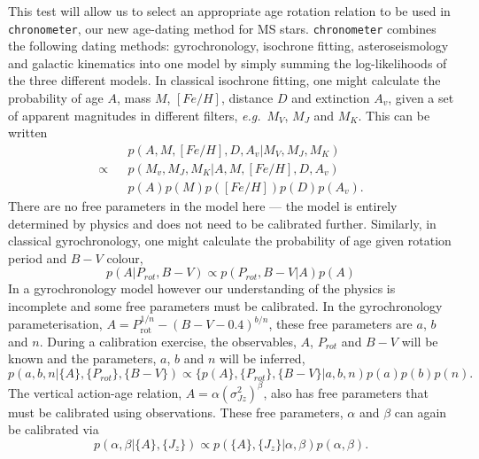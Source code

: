 \documentclass[12pt]{article}
\newcommand{\av}{$A_v$}
\newcommand{\eg}{{\it e.g.}}
\newcommand{\feh}{$[Fe/H]$}
\begin{document}
This test will allow us to select an appropriate age rotation relation to be
used in {\tt chronometer}, our new age-dating method for MS stars.
{\tt chronometer} combines the following dating methods: gyrochronology,
isochrone fitting, asteroseismology and galactic kinematics into one model by
simply summing the log-likelihoods of the three different models.
In classical isochrone fitting, one might calculate the probability of age
$A$, mass $M$, \feh, distance $D$ and extinction \av, given a set of
apparent magnitudes in different filters, \eg\ $M_V$, $M_J$ and $M_K$.
This can be written
\begin{eqnarray}
    &&p(A, M, [Fe/H], D, A_v | M_V, M_J, M_K) \\ \nonumber
    \propto &&p(M_v, M_J, M_K | A, M, [Fe/H], D, A_v) \\ \nonumber
    &&p(A)p(M)p([Fe/H])p(D)p(A_v).
\end{eqnarray}
There are no free parameters in the model here --- the model is entirely
determined by physics and does not need to be calibrated further.
Similarly, in classical gyrochronology, one might calculate the probability of
age given rotation period and $B-V$ colour,
\begin{equation}
    p(A | P_{rot}, B-V) \propto p(P_{rot}, B-V | A)p(A)
\end{equation}
In a gyrochronology model however our understanding of the physics is
incomplete and some free parameters must be calibrated.
In the \citet{Barnes2003} gyrochronology parameterisation, $A =
P_{\mathrm{rot}}^{1/n} - (B-V-0.4)^{b/n}$, these free parameters are $a$, $b$
and $n$.
During a calibration exercise, the observables, $A$, $P_{rot}$ and $B-V$ will
be known and the parameters, $a$, $b$ and $n$ will be inferred,
\begin{equation}
    p(a, b, n | \{A\}, \{P_{rot}\}, \{B-V\}) \propto \{p(A\}, \{P_{rot}\},
    \{B-V\} | a, b, n) p(a)p(b)p(n).
\end{equation}
The vertical action-age relation, $A = \alpha (\sigma_{Jz}^2)^\beta$,
also has free parameters that must be calibrated using observations.
These free parameters, $\alpha$ and $\beta$ can again be calibrated via
\begin{equation}
    p(\alpha, \beta | \{A\}, \{J_z\}) \propto p(\{A\}, \{J_z\} | \alpha,
    \beta) p(\alpha, \beta).
\end{equation}
\end{document}
